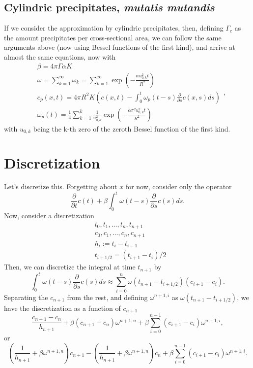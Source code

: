 \documentclass[]{article}
\newcommand{\pderiv}[2]{\frac{\partial #1}{\partial #2}}
\begin{document}
\subsection{Cylindric precipitates, \textit{mutatis mutandis}}
If we consider the approximation by cylindric precipitates, then, defining $\Gamma_c$ as the amount precipitates per cross-sectional area, we can follow the same arguments above (now using Bessel functions of the first kind), and arrive at almost the same equations, now with
\begin{equation}
	\begin{split}
		& \beta = 4 \pi \Gamma \alpha K \\
		& \omega = \sum_{k=1}^\infty \omega_k = \sum_{k=1}^\infty \exp \left( -\frac{\alpha u_{0, k}^2 t}{R^2} \right) \\
		& c_p(x,t) = 4 \pi R^2 K \left( c(x,t) - \int_0^t \omega_p(t-s) \pderiv{}{s} c(x, s) ds \right) \\
		& \omega_p(t) = \frac{1}{4} \sum_{k=1}^k \frac{1}{u_{0, k}^2} \exp \left( -\frac{\alpha \pi^2 u_{0, k}^2 t}{R^2} \right)
	\end{split},
\end{equation}
with $u_{0, k}$ being the k-th zero of the zeroth Bessel function of the first kind.

\section{Discretization}
Let's discretize this. Forgetting about $x$ for now, consider only the operator
\begin{equation}
	\pderiv{}{t} c(t) + \beta \int_0^t \omega(t - s) \pderiv{}{s} c(s) ds.
\end{equation}
Now, consider a discretization
\begin{equation}
	\begin{split}
	& t_0, t_1, \ldots, t_n, t_{n+1} \\
	& c_0, c_1, \ldots, c_n, c_{n+1} \\
	& h_i := t_{i} - t_{i-1} \\
	& t_{i+1/2} = (t_{i+1} - t_{i})/2
	\end{split}
\end{equation}
Then, we can discretize the integral at time $t_{n+1}$ by
\begin{equation}
	\int_0^t \omega(t - s) \pderiv{}{s} c(s) ds \approx \sum_{i=0}^n \omega(t_{n+1} - t_{i+{1/2}}) (c_{i+1} - c_{i}).
\end{equation}
Separating the $c_{n+1}$ from the rest, and defining $\omega^{n+1, i}$ as $\omega(t_{n+1} - t_{i+{1/2}})$, we have the discretization as a function of $c_{n+1}$
\begin{equation}
	\frac{c_{n+1} - c_{n}}{h_{n+1}} + \beta (c_{n+1} - c_n) \omega^{n+1, n} + \beta \sum_{i=0}^{n-1} (c_{i+1} - c_i) \omega^{n+1, i},
\end{equation}
or
\begin{equation}
	\left(\frac{1}{h_{n+1}} + \beta \omega^{n+1, n} \right) c_{n+1} - \left(\frac{1}{h_{n+1}} + \beta \omega^{n+1, n} \right) c_{n} + \beta \sum_{i=0}^{n-1} (c_{i+1} - c_i) \omega^{n+1, i}.
\end{equation}
\end{document}
